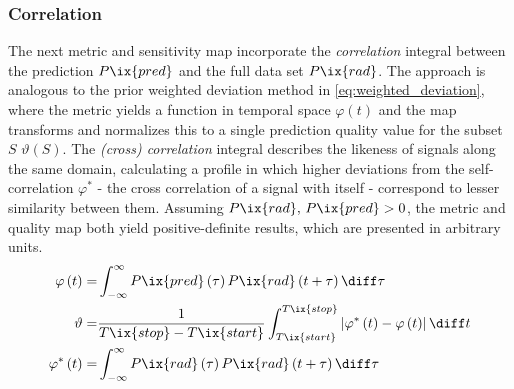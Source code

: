             \subsubsection*{Correlation}%
%
                The next metric and sensitivity map incorporate the \textit{correlation} integral between the prediction $P\ix{pred}$ and the full data set $P\ix{rad}$. The approach is analogous to the prior weighted deviation method in \cref{eq:weighted_deviation}, where the metric yields a function in temporal space $\varphi\left(t\right)$ and the map transforms and normalizes this to a single prediction quality value for the subset $S$ $\vartheta\left(S\right)$. The \textit{(cross) correlation} integral describes the likeness of signals along the same domain, calculating a profile in which higher deviations from the self-correlation $\varphi^{\ast}$ - the cross correlation of a signal with itself - correspond to lesser similarity between them. Assuming $P\ix{rad},\,P\ix{pred}>0$, the metric and quality map both yield positive-definite results, which are presented in arbitrary units.%
%
                \begin{align}%
                    \begin{split}\label{eq:correlation}%
                        \varphi\left(t\right)=&\int_{-\infty}^{\infty}P\ix{pred}\left(\tau\right)P\ix{rad}\left(t+\tau\right)\diff \tau\\%
                        \vartheta=&\frac{1}{T\ix{stop}-T\ix{start}}\int_{T\ix{start}}^{T\ix{stop}}\left|\varphi^{\ast}\left(t\right)-\varphi\left(t\right)\right|\diff t\\%
                        \varphi^{\ast}\left(t\right)=&\int_{-\infty}^{\infty}P\ix{rad}\left(\tau\right)P\ix{rad}\left(t+\tau\right)\diff \tau%
                    \end{split}%
                \end{align}%
%
